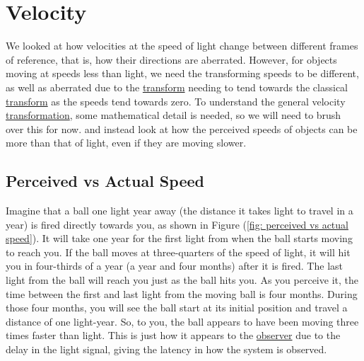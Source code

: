 
\section{Velocity} \label{sect: (intro) Velocity}

We looked at how velocities at the speed of light change between different frames of reference, that is, how their directions are aberrated.
However, for objects moving at speeds less than light, we need the transforming speeds to be different, as well as aberrated due to the \hyperlink{def-transform}{transform} needing to tend towards the classical \hyperlink{def-transform}{transform} as the speeds tend towards zero.
To understand the general velocity \hyperlink{def-transform}{transformation}, some mathematical detail is needed, so we will need to brush over this for now. and instead look at how the perceived speeds of objects can be more than that of light, even if they are moving slower.

\subsection{Perceived vs Actual Speed} \label{subsect: Perceived vs Actual Speed}

Imagine that a ball one light year away (the distance it takes light to travel in a year) is fired directly towards you, as shown in Figure (\ref{fig: perceived vs actual speed}).
It will take one year for the first light from when the ball starts moving to reach you.
If the ball moves at three-quarters of the speed of light, it will hit you in four-thirds of a year (a year and four months) after it is fired.
The last light from the ball will reach you just as the ball hits you.
As you perceive it, the time between the first and last light from the moving ball is four months.
During those four months, you will see the ball start at its initial position and travel a distance of one light-year.
So, to you, the ball appears to have been moving three times faster than light.
This is just how it appears to the \hyperlink{def-observer}{observer} due to the delay in the light signal, giving the latency in how the system is observed.

